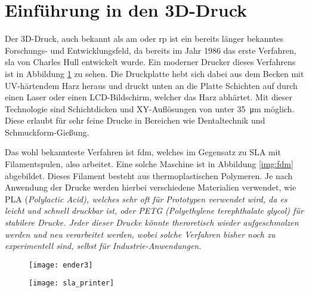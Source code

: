 \documentclass[../main.tex]{subfiles}
\begin{document}
\section{Einführung in den 3D-Druck}
Der 3D-Druck, auch bekannt als \acrfull{am} oder \gls{rp} ist ein bereits länger bekanntes Forschungs- und Entwicklungsfeld, da bereits im Jahr 1986 das erste Verfahren, \acrfull{sla} von Charles Hull entwickelt wurde.
Ein moderner Drucker dieses Verfahrens ist in Abbildung \ref{img:sla} zu sehen. 
Die Druckplatte hebt sich dabei aus dem Becken mit UV-härtendem Harz heraus und druckt unten an die Platte Schichten auf durch einen Laser oder einen LCD-Bildschirm, welcher das Harz abhärtet. 
Mit dieser Technologie sind Schichtdicken und XY-Auflösungen von unter \qty{35}{\micro\meter} möglich. Diese erlaubt für sehr feine Drucke in Bereichen wie Dentaltechnik und Schmuckform-Gießung. \parencite{FORMLABS_1}

Das wohl bekannteste Verfahren ist \acrfull{fdm}, welches im Gegensatz zu SLA mit Filamentspulen, also  arbeitet. Eine solche Maschine ist in  Abbildung \ref{img:fdm} abgebildet.
Dieses Filament besteht aus thermoplastischen Polymeren. Je nach Anwendung der Drucke werden hierbei verschiedene Materialien verwendet, wie PLA (\it{Polylactic Acid}), welches sehr oft für Prototypen verwendet wird, da es leicht und schnell druckbar ist, oder PETG (\it{Polyethylene terephthalate glycol}) für stabilere Drucke. 
Jeder dieser Drucke könnte theroretisch wieder aufgeschmolzen werden und neu verarbeitet werden, wobei solche Verfahren bisher noch zu experimentell sind, selbst für Industrie-Anwendungen. \parencite{OLADAPO2023165046}  

\begin{figure}[h]
\centering
\begin{minipage}{.5\textwidth}
  \centering
  \texttt{[image: ender3]}
  \label{img:fdm}
\end{minipage}%
\begin{minipage}{.5\textwidth}
  \centering
  \texttt{[image: sla\_printer]}
  \label{img:sla}
\end{minipage}
\end{figure}
\end{document}
